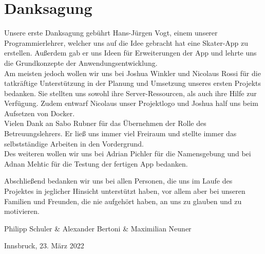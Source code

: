 \section*{Danksagung}
Unsere erste Danksagung gebührt Hans-Jürgen Vogt, einem unserer Programmierlehrer, welcher uns auf
die Idee gebracht hat eine Skater-App zu erstellen. Außerdem gab er uns Ideen für Erweiterungen der
App und lehrte uns die Grundkonzepte der Anwendungsentwicklung. \\

Am meisten jedoch wollen wir uns bei Joshua Winkler und Nicolaus Rossi für die tatkräftige
Unterstützung in der Planung und Umsetzung unseres ersten Projekts bedanken. Sie stellten uns sowohl
ihre Server-Ressourcen, als auch ihre Hilfe zur Verfügung. Zudem entwarf Nicolaus unser Projektlogo
und Joshua half uns beim Aufsetzen von Docker. \\

Vielen Dank an Sabo Rubner für das Übernehmen der Rolle des Betreuungslehrers. Er ließ uns immer
viel Freiraum und stellte immer das selbstständige Arbeiten in den Vordergrund. \\

Des weiteren wollen wir uns bei Adrian Pichler für die Namensgebung und bei Adnan Mehtic für die
Testung der fertigen App bedanken.

Abschließend bedanken wir uns bei allen Personen, die uns im Laufe des Projektes in jeglicher
Hinsicht unterstützt haben, vor allem aber bei unseren Familien und Freunden, die nie aufgehört
haben, an uns zu glauben und zu motivieren. \\

\vspace{2cm}

Philipp Schuler \& Alexander Bertoni \& Maximilian Neuner

Innsbruck, 23. März 2022

\newpage